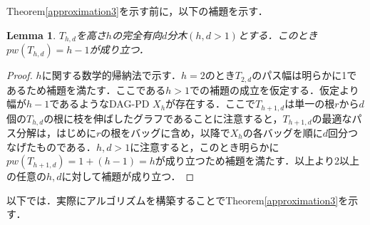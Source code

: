 \documentclass[master]{kuisthesis}		%
\theoremstyle{plain}
\newtheorem{lemma}{Lemma}
\theoremstyle{definition}
\begin{document}
Theorem\ref{approximation3}を示す前に，以下の補題を示す．

\begin{lemma}\label{comp_tree}
    $T_{h, d}$を高さ$h$の完全有向$d$分木$(h, d > 1)$とする．このとき$pw(T_{h, d}) = h-1$が成り立つ．
\end{lemma}

\begin{proof}
    $h$に関する数学的帰納法で示す．$h=2$のとき$T_{2, d}$のパス幅は明らかに1であるため補題を満たす．ここである$h > 1$での補題の成立を仮定する．仮定より幅が$h-1$であるようなDAG-PD $X_h$が存在する．ここで$T_{h+1, d}$は単一の根$r$から$d$個の$T_{h, d}$の根に枝を伸ばしたグラフであることに注意すると，$T_{h+1, d}$の最適なパス分解は，はじめに$r$の根をバッグに含め，以降で$X_h$の各バッグを順に$d$回分つなげたものである．$h, d > 1$に注意すると，このとき明らかに$pw(T_{h+1, d}) = 1 + (h-1) = h$が成り立つため補題を満たす．以上より2以上の任意の$h, d$に対して補題が成り立つ．
\end{proof}



以下では．実際にアルゴリズムを構築することでTheorem\ref{approximation3}を示す．
\end{document}
